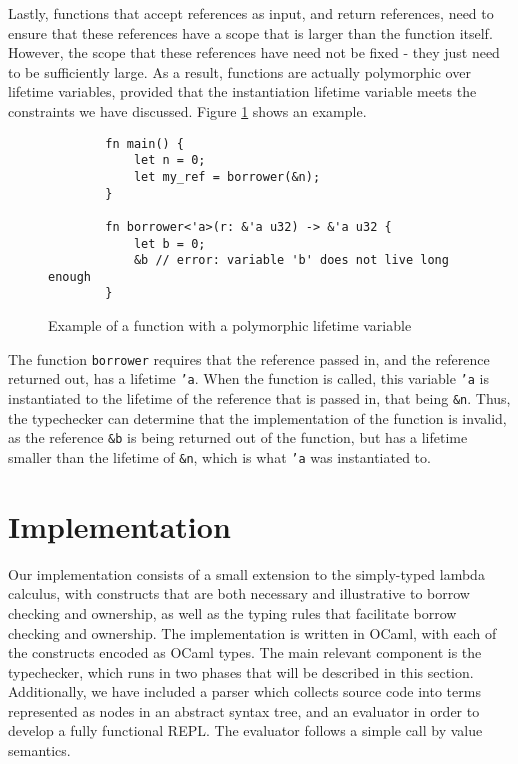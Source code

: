 \documentclass[letterpaper,11pt]{article}
\begin{document}
Lastly, functions that accept references as input, and return references, need to
ensure that these references have a scope that is larger than the function itself.
However, the scope that these references have need not be fixed - they just need
to be sufficiently large. As a result, functions are actually polymorphic over
lifetime variables, provided that the instantiation lifetime variable meets
the constraints we have discussed. Figure \ref{lfpolyex} shows an example.
\begin{figure}[h]
    \begin{lstlisting}
        fn main() {
            let n = 0;
            let my_ref = borrower(&n);
        }

        fn borrower<'a>(r: &'a u32) -> &'a u32 {
            let b = 0;
            &b // error: variable 'b' does not live long enough 
        }
    \end{lstlisting}
    \caption{Example of a function with a polymorphic lifetime variable}
    \label{lfpolyex}
\end{figure}
The function \texttt{borrower} requires that the reference passed in, and the
reference returned out, has a lifetime \texttt{'a}. When the function is called,
this variable \texttt{'a} is instantiated to the lifetime of the reference that
is passed in, that being \texttt{\&n}. Thus, the typechecker can determine that
the implementation of the function is invalid, as the reference \texttt{\&b} is
being returned out of the function, but has a lifetime smaller than the lifetime
of \texttt{\&n}, which is what \texttt{'a} was instantiated to.

\section{Implementation}
Our implementation consists of a small extension to the simply-typed lambda calculus,
with constructs that are both necessary and illustrative to borrow checking and ownership,
as well as the typing rules that facilitate borrow checking and ownership. The
implementation is written in OCaml, with each of the constructs encoded as
OCaml types. The main relevant component is the typechecker, which runs in two
phases that will be described in this section. Additionally, we have included a
parser which collects source code into terms represented as nodes in an abstract syntax tree, 
and an evaluator in order to develop a fully functional REPL. The evaluator follows a simple
call by value semantics.
\end{document}
